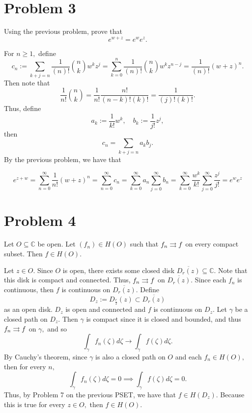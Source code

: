 \documentclass[11pt]{article}
\newcommand{\bbC}{\mathbb{C}}
\begin{document}
\section*{Problem 3}
\begin{problem}
    Using the previous problem, prove that 
    \[e^{w + z} = e^{w} e^{z}.\]
\end{problem}
\begin{solution}
For $n\geq 1,$ define
\[c_n := \sum_{k + j = n}\frac{1}{(n)!}\binom{n}{k}w^k z^{j} = \sum_{k=0}^{n}\frac{1}{(n)!}\binom{n}{k}w^k z^{n-j} = \frac{1}{(n)!}(w + z)^{n}.\] Then note that 
\[\frac{1}{n!}\binom{n}{k} = \frac{1}{n!}\frac{n!}{(n-k)! (k)!} = \frac{1}{(j)! (k)!}.\] Thus, define 
\[a_k := \frac{1}{k!}w^k, \quad b_k := \frac{1}{j!}z^j,\] then 
\[c_n = \sum_{k +j = n} a_k b_j.\] By the previous problem, we have that 

\[e^{z + w} = \sum_{n=0}^\infty \frac{1}{n!}(w + z)^n =  \sum_{n=0}^\infty c_n = \sum_{k=0}^\infty a_n \sum_{j=0}^\infty b_n = \sum_{k=0}^\infty\frac{w^k}{k!}  \sum_{j=0}^\infty \frac{z^j}{j!} = e^w e^z\]

\end{solution}
\newpage
\section*{Problem 4}
\begin{problem}
    Let $O \subseteq \bbC$ be open. Let $(f_n) \in H(O)$ such that $f_n \overset{}{\rightrightarrows} f$ on every compact subset. Then $f\in H(O).$
\end{problem}
\begin{solution}
    Let $z\in O.$ Since $O$ is open, there exists some closed disk $ \overline{D_r(z)} \subseteq \bbC.$ Note that this disk is compact and connected. Thus, $f_n \overset{}{\rightrightarrows} f$ on $\overline{D_r(z)}.$ Since each $f_n$ is continuous, then $f$ is continuous on $\overline{D_r(z)}.$ Define \[D_z := D_{\frac{r}{2}}(z) \subset \overline{D_r(z)}\] as an open disk. $D_z$ is open and connected and $f$ is continuous on $D_z.$ Let $\gamma$ be a closed path on $D_z.$ Then $\gamma$ is compact since it is closed and bounded, and thus $f_n \overset{}{\rightrightarrows} f$ on $\gamma,$ and so 
    \[\int_\gamma f_n(\zeta)d\zeta \to \int_\gamma f(\zeta)d\zeta.\] By Cauchy's theorem, since $\gamma$ is also a closed path on $O$ and each $f_n \in H(O),$ then for every $n,$ 
    \[\int_\gamma f_n(\zeta)d\zeta = 0\implies \int_\gamma f(\zeta)d\zeta = 0.\] Thus, by Problem 7 on the previous PSET, we have that $f\in H(D_z).$ Because this is true for every $z\in O,$ then $f\in H(O).$
\end{solution}
\end{document}
